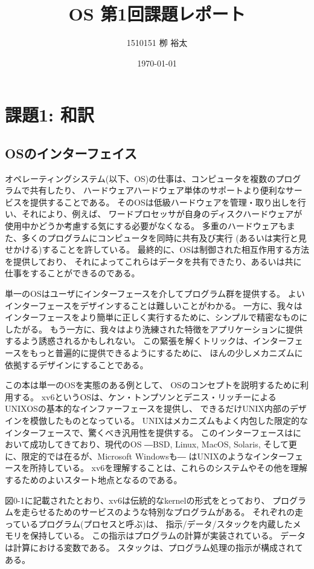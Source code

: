 \documentclass[11pt,a4paper, uplatex]{jsarticle}
\title{OS 第1回課題レポート}
\author{1510151  栁 裕太}
\date{\today}
\begin{document}
\maketitle
\section{課題1: 和訳}

\subsection{OSのインターフェイス}
オペレーティングシステム(以下、OS)の仕事は、コンピュータを複数のプログラムで共有したり、
ハードウェアハードウェア単体のサポートより便利なサービスを提供することである。
そのOSは低級ハードウェアを管理・取り出しを行い、それにより、例えば、
ワードプロセッサが自身のディスクハードウェアが使用中かどうか考慮する気にする必要がなくなる。
多重のハードウェアもまた、多くのプログラムにコンピュータを同時に共有及び実行
(あるいは実行と見せかける)することを許している。
最終的に、OSは制御された相互作用する方法を提供しており、
それによってこれらはデータを共有できたり、あるいは共に仕事をすることができるのである。

単一のOSはユーザにインターフェースを介してプログラム群を提供する。
よいインターフェースをデザインすることは難しいことがわかる。
一方に、我々はインターフェースをより簡単に正しく実行するために、シンプルで精密なものにしたがる。
もう一方に、我々はより洗練された特徴をアプリケーションに提供するよう誘惑されるかもしれない。
この緊張を解くトリックは、インターフェースをもっと普遍的に提供できるようにするために、
ほんの少しメカニズムに依拠するデザインにすることである。

この本は単一のOSを実態のある例として、
OSのコンセプトを説明するために利用する。
xv6というOSは、ケン・トンプソンとデニス・リッチーによる
UNIXOSの基本的なインファーフェースを提供し、
できるだけUNIX内部のデザインを模倣したものとなっている。
UNIXはメカニズムもよく内包した限定的なインターフェースで、驚くべき汎用性を提供する。
このインターフェースはにおいて成功してきており、現代のOS
―BSD, Linux, MacOS, Solaris, そして更に、限定的では在るが、Microsoft Windowsも―
はUNIXのようなインターフェースを所持している。
xv6を理解することは、これらのシステムやその他を理解するためのよいスタート地点となるのである。

図0-1に記載されたとおり、xv6は伝統的なkernelの形式をとっており、
プログラムを走らせるためのサービスのような特別なプログラムがある。
それぞれの走っているプログラム(プロセスと呼ぶ)は、
指示/データ/スタックを内蔵したメモリを保持している。
この指示はプログラムの計算が実装されている。
データは計算における変数である。
スタックは、プログラム処理の指示が構成されてある。
\end{document}
